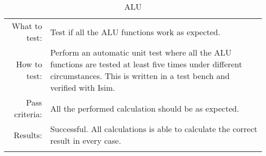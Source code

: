 \begin{table}[H]
  \begin{tabular}{r | p{9cm}}
    \noalign{\smallskip}\hline\noalign{\smallskip}
    
    What to test:  & Test if all the ALU functions work as expected.\\

    \noalign{\smallskip}\hline\noalign{\smallskip}

    How to test:   &    Perform an automatic unit test where all the ALU functions are tested at least five times 
                        under different circumstances. This is written in a test bench and verified with Isim.   \\
                      
    \noalign{\smallskip}\hline\noalign{\smallskip}

    Pass criteria: &    All the performed calculation should be as expected.
                        \\
    \noalign{\smallskip}\hline\noalign{\smallskip}
    
    Results: &      Successful. All calculations is able to calculate the correct result in every case. 
                    \\
   \noalign{\smallskip}\hline\noalign{\smallskip}
  
  
  \end{tabular}
  \caption{ALU}
  \label{testing:components:fitness:ALU}
\end{table}
